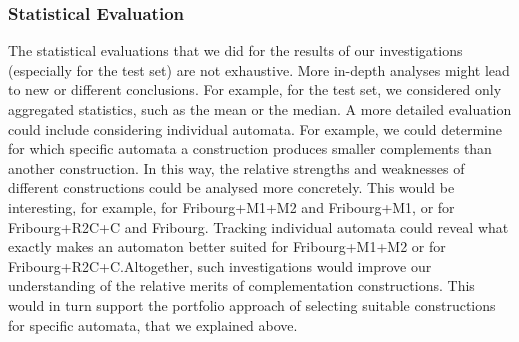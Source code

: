 \subsubsection{Statistical Evaluation}
The statistical evaluations that we did for the results of our investigations (especially for the \goal{} test set) are not exhaustive. More in-depth analyses might lead to new or different conclusions. For example, for the \goal{} test set, we considered only aggregated statistics, such as the mean or the median. A more detailed evaluation could include considering individual automata. For example, we could determine for which specific automata a construction produces smaller complements than another construction. In this way, the relative strengths and weaknesses of different constructions could be analysed more concretely. This would be interesting, for example, for Fribourg+M1+M2 and Fribourg+M1, or for Fribourg+R2C+C and Fribourg. Tracking individual automata could reveal what exactly makes an automaton better suited for Fribourg+M1+M2 or for Fribourg+R2C+C.Altogether, such investigations would improve our understanding of the relative merits of complementation constructions. This would in turn support the portfolio approach of selecting suitable constructions for specific automata, that we explained above.
